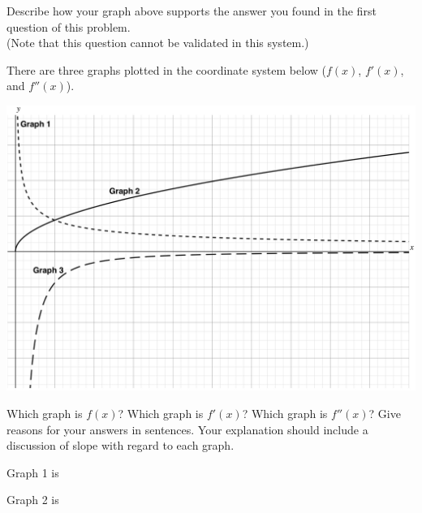 \documentclass[handout]{ximera}
\begin{document}
\begin{problem}
\begin{question}
Describe how your graph above supports the answer you found in the first question of this problem. \\(Note that this question cannot be validated in this system.)
\begin{freeResponse}
\end{freeResponse}
\end{question}
\end{problem}

\begin{problem}
There are three graphs plotted in the coordinate system below ($f(x)$, $f'(x)$, and $f''(x)$). 


\includegraphics[scale=.01]{SVA-label.png}


Which graph is $f(x)$? Which graph is $f'(x)$? Which graph is $f''(x)$? Give reasons for your answers in sentences. Your explanation should include a discussion of slope with regard to each graph.

\begin{question}
Graph 1 is
\begin{multipleChoice}
\end{multipleChoice}
\end{question}

\begin{question}
Graph 2 is
\begin{multipleChoice}
\end{multipleChoice}
\end{question}


\end{problem}
\end{document}
